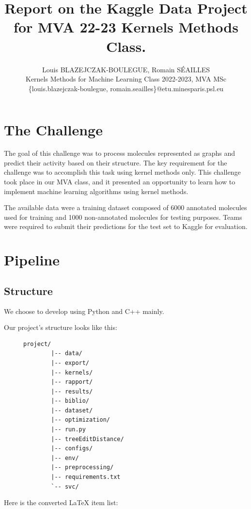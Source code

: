 \documentclass{IEEEtran}
\title{
    \huge{
        Report on the Kaggle Data Project
        for
        MVA 22-23 Kernels Methods Class.
        }
}
\author{Louis BLAZEJCZAK-BOULEGUE, Romain SÉAILLES\\
Kernels Methods for Machine Learning Class 2022-2023, MVA MSc\\
    \{louis.blazejczak-boulegue, romain.seailles\}@etu.minesparis.psl.eu
}
\begin{document}
\maketitle

\section{The Challenge}

The goal of this challenge was to process molecules represented as graphs and predict their activity based on their structure. The key requirement for the challenge was to accomplish this task using kernel methods only. This challenge took place in our MVA class, and it presented an opportunity to learn how to implement machine learning algorithms using kernel methods.

The available data were a training dataset composed of 6000 annotated molecules used for training and 1000 non-annotated molecules for testing purposes. Teams were required to submit their predictions for the test set to Kaggle for evaluation.

\section{Pipeline}

\subsection{Structure}
We choose to develop using Python and C++ mainly.

Our project's structure looks like this:

\begin{figure}[h]
    \begin{lstlisting}[frame=none,basicstyle=\ttfamily]
        project/
        |-- data/
        |-- export/
        |-- kernels/
        |-- rapport/
        |-- results/
        |-- biblio/
        |-- dataset/
        |-- optimization/
        |-- run.py
        |-- treeEditDistance/
        |-- configs/
        |-- env/
        |-- preprocessing/
        |-- requirements.txt
        `-- svc/
    \end{lstlisting}
    \label{fig:project-structure}
\end{figure}


Here is the converted LaTeX item list:
\end{document}
